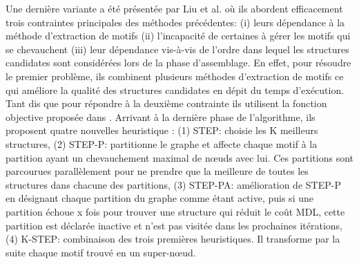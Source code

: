 Une dernière variante a été présentée par Liu et al. \citep{liu2018reducing} où ils abordent efficacement trois contraintes principales des  méthodes précédentes: 
				(i) leurs dépendance à la méthode d'extraction de motifs 
				(ii) l'incapacité de certaines à gérer les motifs qui se chevauchent 
				(iii) leur dépendance vis-à-vis de l'ordre dans lequel les structures candidates sont considérées lors de la phase d'assemblage. En effet, pour résoudre le premier problème, ils combinent plusieurs méthodes d'extraction de motifs ce qui améliore la qualité des structures candidates en dépit  du temps d'exécution. Tant dis que pour répondre à la deuxième contrainte ils utilisent la fonction objective proposée dans \citep{liu2015empirical}. Arrivant à la dernière phase de l'algorithme, ils proposent quatre nouvelles heuristique : 
				(1) STEP: choisie les K  meilleurs structures, 
				(2) STEP-P: partitionne le graphe et affecte chaque motif  à la partition ayant un chevauchement maximal de nœuds avec lui. Ces partitions sont parcourues parallèlement pour ne prendre que la meilleure de toutes les structures dans chacune des partitions,
				(3) STEP-PA: amélioration de STEP-P en désignant chaque partition du graphe comme étant active, puis si une partition échoue x fois pour trouver une structure qui réduit le coût MDL, cette partition est déclarée inactive et n'est pas visitée dans les prochaines itérations,
				 (4) K-STEP: combinaison des trois premières heuristiques. Il transforme par la suite chaque motif trouvé en un super-nœud.		